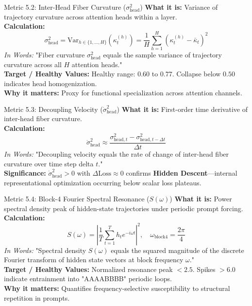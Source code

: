 \documentclass[10pt,a4paper]{article}
\begin{document}
\begin{metricbox}{Metric 5.2: Inter-Head Fiber Curvature ($\sigma^2_{\text{head}}$)}
\textbf{What it is:} Variance of trajectory curvature across attention heads within a layer.\\
\textbf{Calculation:}
$$\sigma^2_{\text{head}} = \text{Var}_{h \in \{1,\dots,H\}}\left(\kappa_t^{(h)}\right) = \frac{1}{H} \sum_{h=1}^H \left(\kappa_t^{(h)} - \bar{\kappa}_t\right)^2$$
\emph{In Words:} "Fiber curvature $\sigma^2_{\text{head}}$ equals the sample variance of trajectory curvature across all $H$ attention heads."\\
\textbf{Target / Healthy Values:} Healthy range: $0.60$ to $0.77$. Collapse below $0.50$ indicates head homogenization.\\
\textbf{Why it matters:} Proxy for functional specialization across attention channels.
\end{metricbox}

\begin{metricbox}{Metric 5.3: Decoupling Velocity ($\dot{\sigma}^2_{\text{head}}$)}
\textbf{What it is:} First-order time derivative of inter-head fiber curvature.\\
\textbf{Calculation:}
$$\dot{\sigma}^2_{\text{head}} \approx \frac{\sigma^2_{\text{head}, t} - \sigma^2_{\text{head}, t-\Delta t}}{\Delta t}$$
\emph{In Words:} "Decoupling velocity equals the rate of change of inter-head fiber curvature over time step delta $t$."\\
\textbf{Significance:} $\dot{\sigma}^2_{\text{head}} > 0$ with $\Delta \text{Loss} \approx 0$ confirms \textbf{Hidden Descent}---internal representational optimization occurring below scalar loss plateaus.
\end{metricbox}

\begin{metricbox}{Metric 5.4: Block-4 Fourier Spectral Resonance ($S(\omega)$)}
\textbf{What it is:} Power spectral density peak of hidden-state trajectories under periodic prompt forcing.\\
\textbf{Calculation:}
$$S(\omega) = \left| \frac{1}{T} \sum_{t=1}^T h_t e^{-i \omega t} \right|^2, \quad \omega_{\text{block4}} = \frac{2\pi}{4}$$
\emph{In Words:} "Spectral density $S(\omega)$ equals the squared magnitude of the discrete Fourier transform of hidden state vectors at block frequency $\omega$."\\
\textbf{Target / Healthy Values:} Normalized resonance peak $< 2.5$. Spikes $> 6.0$ indicate entrainment into "AAAABBBB" periodic loops.\\
\textbf{Why it matters:} Quantifies frequency-selective susceptibility to structural repetition in prompts.
\end{metricbox}
\end{document}
